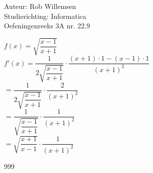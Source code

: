 \documentclass[a4paper]{article}
\begin{document}
\noindent \large Auteur: Rob Willemsen \\
\noindent \large Studierichting: Informatica\\
\noindent \large Oefeningenreeks 3A nr. 22.9\\

\medskip

\normalsize

$f(x) = \sqrt{\dfrac{x-1}{x+1}}$ \\

$f'(x) = \dfrac{1}{2 \sqrt{\dfrac{x-1}{x+1}}} \cdot \dfrac{(x+1) \cdot 1 - (x-1) \cdot 1}{(x+1)^2}$ \\

$= \dfrac{1}{2 \sqrt{\dfrac{x-1}{x+1}}} \cdot \dfrac{2}{(x+1)^2}$ \\

$= \dfrac{1}{\sqrt{\dfrac{x-1}{x+1}}} \cdot \dfrac{1}{(x+1)^2}$ \\

$= \sqrt{\dfrac{x+1}{x-1}} \cdot \dfrac{1}{(x+1)^2}$ \\

\begin{thebibliography}{999}
\end{thebibliography}
\end{document}
